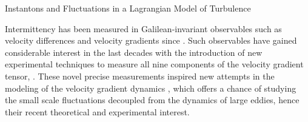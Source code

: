 \begin{chapter}{Instantons and Fluctuations in a Lagrangian Model of Turbulence}
\label{chap:rfd}

\hspace{5 mm} 

Intermittency has been measured in Galilean-invariant observables such as velocity differences and velocity gradients since \textcite{batchelor1949}. 
Such observables have gained considerable interest in the last decades with the introduction of new experimental techniques to measure all nine components of the velocity gradient tensor,
\parencite{Wallace9,tsinober1992experimental,zeff2003,wallace2009,WallaceVukoslav2010,KatzSheng2010}. These novel precise measurements inspired new attempts in the modeling of the velocity gradient dynamics \parencite{frisch1995,Chev2006,ChevPRL}, which offers a chance of studying the small scale fluctuations decoupled from the dynamics of large eddies, hence their recent theoretical and experimental interest.


\end{chapter}
